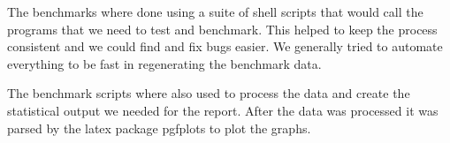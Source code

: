 The benchmarks where done using a suite of shell scripts that would call the programs that we need to test and benchmark.
This helped to keep the process consistent and we could find and fix bugs easier.
We generally tried to automate everything to be fast in regenerating the benchmark data.


The benchmark scripts where also used to process the data and create the statistical output we needed for the report.
After the data was processed it was parsed by the latex package pgfplots to plot the graphs.

